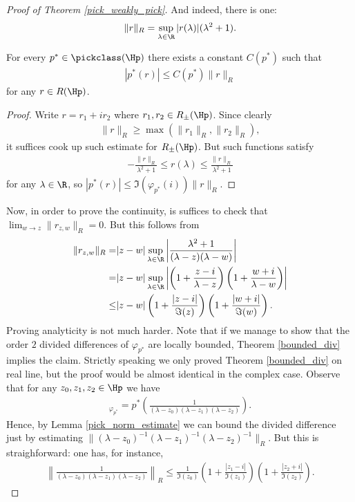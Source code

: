 \begin{proof}[Proof of Theorem \ref{pick_weakly_pick}]
	And indeed, there is one:
	\begin{align*}
		\|r\|_{R} = \sup_{\lambda \in \R} |r(\lambda)| (\lambda^2 + 1).
	\end{align*}
	\begin{lem}\label{pick_norm_estimate}
		For every $p^{*} \in \pickclass(\Hp)$ there exists a constant $C(p^{*})$ such that
		\begin{align*}
			\left|p^{*} (r)\right| \leq C(p^{*}) \|r\|_{R}
		\end{align*}
		for any $r \in R(\Hp)$.
	\end{lem}
	\begin{proof}
		Write $r = r_{1} + i r_{2}$ where $r_{1}, r_{2} \in R_{\pm}(\Hp)$. Since clearly
		\begin{align*}
			\|r\|_{R} \geq \max(\|r_{1}\|_{R}, \|r_{2}\|_{R}),
		\end{align*}
		it suffices cook up such estimate for $R_{\pm}(\Hp)$. But such functions satisfy
		\begin{align*}
			-\frac{\|r\|_{R}}{\lambda^2 + 1} \leq r(\lambda) \leq \frac{\|r\|_{R}}{\lambda^2 + 1} 
		\end{align*}
		for any $\lambda \in \R$, so $|p^{*}(r)| \leq \Im(\varphi_{p^{*}}(i)) \|r\|_{R}$.
	\end{proof}
	Now, in order to prove the continuity, is suffices to check that $\lim_{w \to z} \|r_{z, w}\|_{R} = 0$. But this follows from
	\begin{align*}
		\|r_{z, w}\|_{R} = & |z - w| \sup_{\lambda \in \R}\left|\frac{\lambda^2 + 1}{(\lambda - z) (\lambda - w)}\right| \\
		= & |z - w| \sup_{\lambda \in \R}\left|\left(1 + \frac{z - i}{\lambda - z}\right) \left(1 + \frac{w + i}{\lambda - w}\right)\right| \\
		\leq & |z - w| \left(1 + \frac{|z - i|}{\Im(z)}\right) \left(1 + \frac{|w + i|}{\Im(w)}\right).
	\end{align*}
	Proving analyticity is not much harder. Note that if we manage to show that the order $2$ divided differences of $\varphi_{p^{*}}$ are locally bounded, Theorem \ref{bounded_div} implies the claim. Strictly speaking we only proved Theorem \ref{bounded_div} on real line, but the proof would be almost identical in the complex case. Observe that for any $z_{0}, z_{1}, z_{2} \in \Hp$ we have
	\begin{align*}
		[z_{0}, z_{1}, z_{2}]_{\varphi_{p^{*}}} = p^{*}\left(\frac{1}{(\lambda - z_{0}) (\lambda - z_{1}) (\lambda - z_{2})} \right).
	\end{align*}
	Hence, by Lemma \ref{pick_norm_estimate} we can bound the divided difference just by estimating $\|(\lambda - z_{0})^{-1} (\lambda - z_{1})^{-1} (\lambda - z_{2})^{-1}\|_{R}$. But this is straighforward: one has, for instance,
	\begin{align*}
		\left\|\frac{1}{(\lambda - z_{0}) (\lambda - z_{1}) (\lambda - z_{2})}\right\|_{R} \leq \frac{1}{\Im(z_{0})} \left(1 + \frac{|z_{1} - i|}{\Im(z_{1})}\right) \left(1 + \frac{|z_{2} + i|}{\Im(z_{2})}\right).
	\end{align*}
\end{proof}


